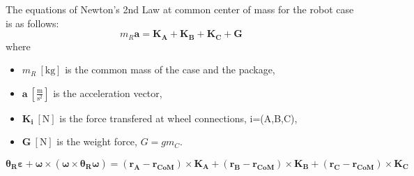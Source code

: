 \documentclass[12pt,english]{article}
\begin{document}
The equations of Newton's 2nd Law at common center of mass for the robot case is as follows:
\begin{equation}
	m_R \mathbf{a} = \mathbf{K_A} + \mathbf{K_B} + \mathbf{K_C} + \mathbf{G}
\end{equation}
where \begin{itemize}
	\item $m_R~[\text{kg}]$ is the common mass of the case and the package,
	\item $\mathbf{a}~[\frac{\text{m}}{\text{s}^2}]$ is the acceleration vector,
	\item $\mathbf{K_i}~[\text{N}]$ is the force transfered at wheel connections, i=(A,B,C),
	\item $\mathbf{G}~[\text{N}]$ is the weight force, $G=g m_C$.
\end{itemize}
\begin{equation}
\boldsymbol{\theta_R} \boldsymbol{\varepsilon} +\boldsymbol{\omega} \times (\boldsymbol{\omega} \times \boldsymbol{\theta_R \boldsymbol{\omega}}) = (\mathbf{r_A}-\mathbf{r_{CoM}}) \times \mathbf{K_A} + (\mathbf{r_B}-\mathbf{r_{CoM}}) \times \mathbf{K_B} + (\mathbf{r_C}-\mathbf{r_{CoM}}) \times  \mathbf{K_C}
\end{equation}
\end{document}

